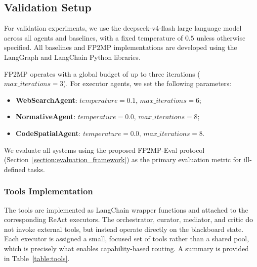 \subsection{Validation Setup}

For validation experiments, we use the deepseek-v4-flash large language model across all agents and baselines, with a fixed temperature of $0.5$ unless otherwise specified.
All baselines and FP2MP implementations are developed using the LangGraph and LangChain Python libraries.

FP2MP operates with a global budget of up to three iterations ($max\_iterations = 3$).
For executor agents, we set the following parameters:
\begin{itemize}
    \item \textbf{WebSearchAgent}: $temperature=0.1$, $max\_iterations=6$;
    \item \textbf{NormativeAgent}: $temperature=0.0$, $max\_iterations=8$;
    \item \textbf{CodeSpatialAgent}: $temperature=0.0$, $max\_iterations=8$.
\end{itemize}

We evaluate all systems using the proposed FP2MP-Eval protocol (Section~\ref{section:evaluation_framework}) as the primary evaluation metric for ill-defined tasks.

\subsubsection{Tools Implementation}

The tools are implemented as LangChain wrapper functions and attached to the corresponding ReAct executors. The orchestrator, curator, mediator, and critic do not invoke external tools, but instead operate directly on the blackboard state.
Each executor is assigned a small, focused set of tools rather than a shared pool, which is precisely what enables capability-based routing.
A summary is provided in Table~\ref{table:tools}.

